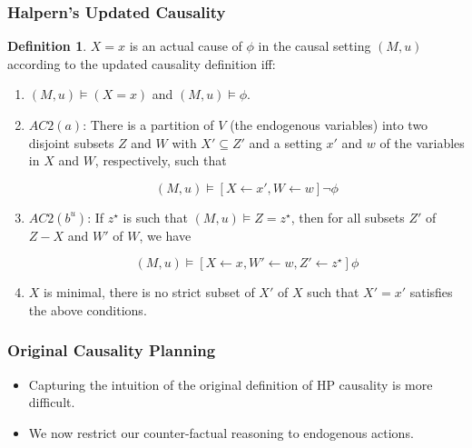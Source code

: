 \documentclass{beamer}
\theoremstyle{plain}
\theoremstyle{definition}
\newtheorem{defn}[thm]{Definition} %
\begin{document}
\begin{frame}
\frametitle{Halpern's Updated Causality}
\begin{defn}$X=x$ is an actual cause of $\phi$ in the causal setting $(M,u)$ according to the updated causality definition iff:
\begin{enumerate}
\item $(M,u) \models (X=x)$ and $(M,u) \models \phi$.
\item $AC2(a)$: There is a partition of $V$ (the endogenous variables) into two disjoint subsets $Z$ and $W$ with $X'\subseteq Z'$ and a setting $x'$ and $w$ of the variables in $X$ and $W$, respectively, such that

\[
(M,u) \models [X\leftarrow x', W\leftarrow w]\lnot \phi
\] 

\item $AC2(b^u)$: If $z^\star$ is such that $(M,u)\models Z = z^\star$, then for all subsets $Z'$ of $Z-X$ and $W'$ of $W$, we have

\[
(M,u) \models [X\leftarrow x, W' \leftarrow w, Z' \leftarrow z^\star]\phi
\] 

\item $X$ is minimal, there is no strict subset of $X'$ of $X$ such that $X' = x'$ satisfies the above conditions.
\end{enumerate}

\end{defn}
\end{frame}








\begin{frame}
\frametitle{Original Causality Planning}
\begin{itemize}
\item Capturing the intuition of the original definition of HP causality is more difficult.
\item We now restrict our counter-factual reasoning to endogenous actions.
\end{itemize}

\end{frame}
\end{document}
